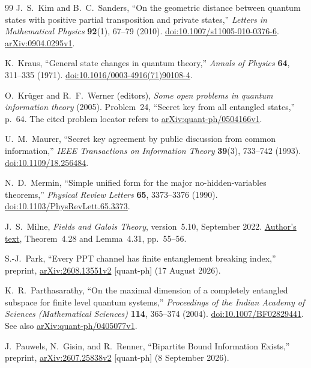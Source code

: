 \begin{thebibliography}{99}
J.~S.~Kim and B.~C.~Sanders,
``On the geometric distance between quantum states with positive partial transposition and private states,''
\emph{Letters in Mathematical Physics} \textbf{92}(1), 67--79 (2010).
\href{https://doi.org/10.1007/s11005-010-0376-6}{doi:10.1007/s11005-010-0376-6}.
\href{https://arxiv.org/abs/0904.0295v1}{arXiv:0904.0295v1}.

K.~Kraus,
``General state changes in quantum theory,'' \emph{Annals of Physics}
\textbf{64}, 311--335 (1971).
\href{https://doi.org/10.1016/0003-4916(71)90108-4}{doi:10.1016/0003-4916(71)90108-4}.

O.~Kr\"uger and R.~F.~Werner (editors),
\emph{Some open problems in quantum information theory} (2005).
Problem~24, ``Secret key from all entangled states,'' p.~64.
The cited problem locator refers to
\href{https://arxiv.org/abs/quant-ph/0504166v1}{arXiv:quant-ph/0504166v1}.

U.~M.~Maurer,
``Secret key agreement by public discussion from common information,''
\emph{IEEE Transactions on Information Theory} \textbf{39}(3),
733--742 (1993).
\href{https://doi.org/10.1109/18.256484}{doi:10.1109/18.256484}.

N.~D.~Mermin,
``Simple unified form for the major no-hidden-variables theorems,''
\emph{Physical Review Letters} \textbf{65}, 3373--3376 (1990).
\href{https://doi.org/10.1103/PhysRevLett.65.3373}{doi:10.1103/PhysRevLett.65.3373}.

J.~S.~Milne,
\emph{Fields and Galois Theory}, version~5.10, September 2022.
\href{https://www.jmilne.org/math/CourseNotes/FT.pdf}{Author's text},
Theorem~4.28 and Lemma~4.31, pp.~55--56.

S.-J.~Park,
``Every PPT channel has finite entanglement breaking index,''
preprint, \href{https://arxiv.org/abs/2608.13551v2}{arXiv:2608.13551v2}
[quant-ph] (17 August 2026).

K.~R.~Parthasarathy,
``On the maximal dimension of a completely entangled
subspace for finite level quantum systems,'' \emph{Proceedings of the Indian Academy
of Sciences (Mathematical Sciences)} \textbf{114}, 365--374 (2004).
\href{https://doi.org/10.1007/BF02829441}{doi:10.1007/BF02829441}.
See also \href{https://arxiv.org/abs/quant-ph/0405077v1}{arXiv:quant-ph/0405077v1}.

J.~Pauwels, N.~Gisin, and R.~Renner,
``Bipartite Bound Information Exists,''
preprint, \href{https://arxiv.org/abs/2607.25838v2}{arXiv:2607.25838v2}
[quant-ph] (8 September 2026).


\end{thebibliography}

